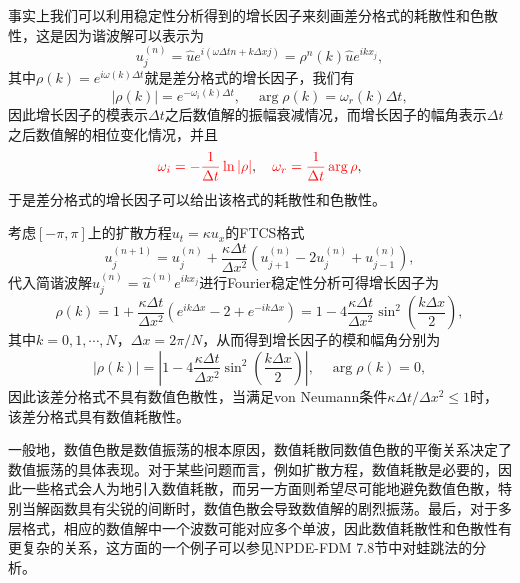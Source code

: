 \documentclass[a4paper,10pt]{ctexart}
\begin{document}
事实上我们可以利用稳定性分析得到的增长因子来刻画差分格式的耗散性和色散性，这是因为谐波解可以表示为
\[
    u^{(n)}_j = \hat{u} e^{i(\omega \Delta t n + k\Delta x j)} =  \rho^n(k) \hat{u} e^{ikx_j},
\]
其中$ \rho(k) = e^{i \omega(k)\Delta t} $就是差分格式的增长因子，我们有
\[
    |\rho(k)| = e^{-\omega_i(k)\Delta t}, \quad \arg \rho(k) = \omega_r(k)\Delta t,
\]
因此增长因子的模表示$ \Delta t $之后数值解的振幅衰减情况，而增长因子的幅角表示$ \Delta t $之后数值解的相位变化情况，并且
\begin{equation}
    \textcolor{red}{\omega_i = -\frac{1}{\Delta t} \ln |\rho|}, \quad \textcolor{red}{\omega_r = \frac{1}{\Delta t} \arg \rho},
\end{equation}
于是差分格式的增长因子可以给出该格式的耗散性和色散性。

\begin{example}
    考虑$ [-\pi,\pi] $上的扩散方程$ u_t = \kappa u_x $的FTCS格式
    \[
        u^{(n+1)}_j = u^{(n)}_j + \frac{\kappa\Delta t}{\Delta x^2} (u^{(n)}_{j+1} - 2u^{(n)}_j + u^{(n)}_{j-1}),
    \]
    代入简谐波解$ u^{(n)}_j = \hat{u}^{(n)} e^{ikx_j} $进行Fourier稳定性分析可得增长因子为
    \[
        \rho(k) = 1 + \frac{\kappa\Delta t}{\Delta x^2} (e^{ik\Delta x} - 2 + e^{-ik\Delta x}) = 1 - 4\frac{\kappa\Delta t}{\Delta x^2} \sin^2(\frac{k\Delta x}{2}),
    \]
    其中$ k = 0,1,\cdots ,N $，$ \Delta x = 2\pi / N $，从而得到增长因子的模和幅角分别为
    \[
        |\rho(k)| = |1 - 4\frac{\kappa\Delta t}{\Delta x^2} \sin^2(\frac{k\Delta x}{2})|, \quad \arg \rho(k) = 0,
    \]
    因此该差分格式不具有数值色散性，当满足von Neumann条件$ \kappa \Delta t / \Delta x^2\leqslant 1 $时，该差分格式具有数值耗散性。
\end{example}

一般地，数值色散是数值振荡的根本原因，数值耗散同数值色散的平衡关系决定了数值振荡的具体表现。对于某些问题而言，例如扩散方程，数值耗散是必要的，因此一些格式会人为地引入数值耗散，而另一方面则希望尽可能地避免数值色散，特别当解函数具有尖锐的间断时，数值色散会导致数值解的剧烈振荡。最后，对于多层格式，相应的数值解中一个波数可能对应多个单波，因此数值耗散性和色散性有更复杂的关系，这方面的一个例子可以参见NPDE-FDM 7.8节中对蛙跳法的分析。
\end{document}
